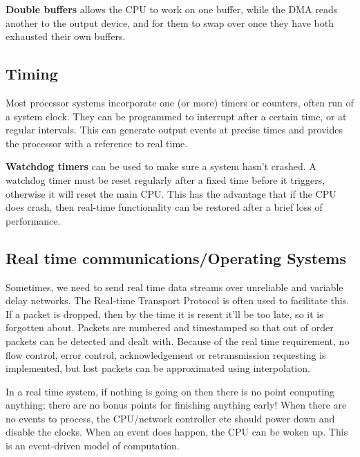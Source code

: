 \textbf{Double buffers} allows the CPU to work on one buffer, while the DMA
reads another to the output device, and for them to swap over once they have
both exhausted their own buffers.

\subsection{Timing}


Most processor systems incorporate one (or more) timers or counters, often run
of a system clock. They can be programmed to interrupt after a certain time, or
at regular intervals. This can generate output events at precise times and
provides the processor with a reference to real time.

\textbf{Watchdog timers} can be used to make sure a system hasn't crashed. A
watchdog timer must be reset regularly after a fixed time before it triggers,
otherwise it will reset the main CPU. This has the advantage that if the CPU
does crash, then real-time functionality can be restored after a brief loss of
performance.

\subsection{Real time communications/Operating Systems}

Sometimes, we need to send real time data streams over unreliable and variable
delay networks. The Real-time Transport Protocol is often used to facilitate
this. If a packet is dropped, then by the time it is resent it'll be too late,
so it is forgotten about. Packets are numbered and timestamped so that out of
order packets can be detected and dealt with. Because of the real time
requirement, no flow control, error control, acknowledgement or retransmission
requesting is implemented, but lost packets can be approximated using
interpolation. 

In a real time system, if nothing is going on then there is no point computing
anything; there are no bonus points for finishing anything early! When there are
no events to process, the CPU/network controller etc should power down and
disable the clocks. When an event does happen, the CPU can be woken up. This is
an event-driven model of computation.

